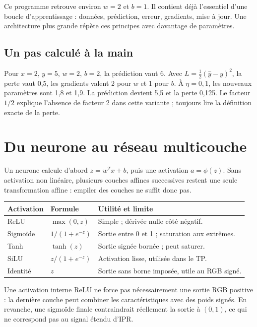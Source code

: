 \documentclass[12pt,a4paper,oneside]{report}
\begin{document}


Ce programme retrouve environ $w=2$ et $b=1$. Il contient déjà l'essentiel d'une
boucle d'apprentissage : données, prédiction, erreur, gradients, mise à jour.
Une architecture plus grande répète ces principes avec davantage de paramètres.

\section{Un pas calculé à la main}

Pour $x=2$, $y=5$, $w=2$, $b=2$, la prédiction vaut 6. Avec
$L=\tfrac12(\hat y-y)^2$, la perte vaut 0,5, les gradients valent 2 pour $w$
et 1 pour $b$. À $\eta=0,1$, les nouveaux paramètres sont 1,8 et 1,9. La prédiction
devient 5,5 et la perte 0,125. Le facteur $1/2$ explique l'absence de facteur 2
dans cette variante ; toujours lire la définition exacte de la perte.

\chapter{Du neurone au réseau multicouche}

Un neurone calcule d'abord $z=w^Tx+b$, puis une activation $a=\phi(z)$.
Sans activation non linéaire, plusieurs couches affines successives restent une
seule transformation affine : empiler des couches ne suffit donc pas.

\begin{longtable}{p{}p{}p{}}
\toprule Activation & Formule & Utilité et limite \\ \midrule
ReLU & $\max(0,z)$ & Simple ; dérivée nulle côté négatif.\\
Sigmoïde & $1/(1+e^{-z})$ & Sortie entre 0 et 1 ; saturation aux extrêmes.\\
Tanh & $\tanh(z)$ & Sortie signée bornée ; peut saturer.\\
SiLU & $z/(1+e^{-z})$ & Activation lisse, utilisée dans le TP.\\
Identité & $z$ & Sortie sans borne imposée, utile au RGB signé.\\
\bottomrule
\end{longtable}

Une activation interne ReLU ne force pas nécessairement une sortie RGB positive :
la dernière couche peut combiner les caractéristiques avec des poids signés.
En revanche, une sigmoïde finale contraindrait réellement la sortie à $(0,1)$,
ce qui ne correspond pas au signal étendu d'IPR.
\end{document}
